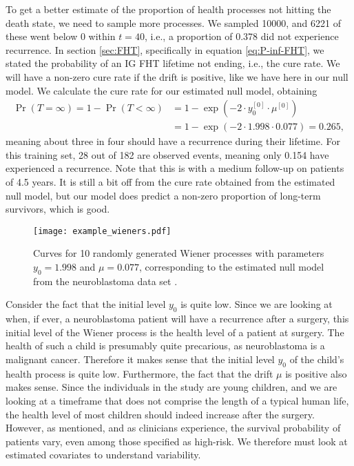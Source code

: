 To get a better estimate of the proportion of health processes not hitting the death state, we need to sample more processes.
We sampled 10000, and 6221 of these went below 0 within $t=40$, i.e., a proportion of 0.378 did not experience recurrence.
In section \ref{sec:FHT}, specifically in equation \eqref{eq:P-inf-FHT}, we stated the probability of an IG FHT lifetime not ending, i.e., the cure rate.
We will have a non-zero cure rate if the drift is positive, like we have here in our null model.
We calculate the cure rate for our estimated null model, obtaining
\begin{align*}
    \Pr{(T=\infty)}=1-\Pr{(T<\infty)}&=1-\exp{(-2\cdot y_0^{[0]}\cdot\mu^{[0]})}\\
    &=1-\exp{(-2\cdot 1.998\cdot 0.077)}=0.265,
\end{align*}
meaning about three in four should have a recurrence during their lifetime.
For this training set, 28 out of 182 are observed events, meaning only 0.154 have experienced a recurrence.
Note that this is with a medium follow-up on patients of 4.5 years.
It is still a bit off from the cure rate obtained from the estimated null model, but our model does predict a non-zero proportion of long-term survivors, which is good.
\begin{figure}
\caption{Curves for 10 randomly generated Wiener processes with parameters $y_0=1.998$ and $\mu=0.077$, corresponding to the estimated null model from the neuroblastoma data set \citep{oberthuer-data}.}
\label{fig:neuroblastoma-wien}
\centering
\texttt{[image: example\_wieners.pdf]}
\end{figure}

Consider the fact that the initial level $y_0$ is quite low.
Since we are looking at when, if ever, a neuroblastoma patient will have a recurrence after a surgery, this initial level of the Wiener process is the health level of a patient at surgery.
The health of such a child is presumably quite precarious, as neuroblastoma is a malignant cancer.
Therefore it makes sense that the initial level $y_0$ of the child's health process is quite low.
Furthermore, the fact that the drift $\mu$ is positive also makes sense.
Since the individuals in the study are young children, and we are looking at a timeframe that does not comprise the length of a typical human life, the health level of most children should indeed increase after the surgery.
However, as mentioned, and as clinicians experience, the survival probability of patients vary, even among those specified as high-risk.
We therefore must look at estimated covariates to understand variability.

